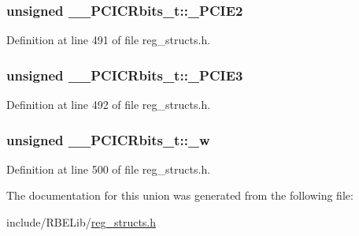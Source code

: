 \hypertarget{union_____p_c_i_c_rbits__t_afb35272c66954efdf211f64643186fb7}{
\subsubsection[{\+\_\+\+P\+C\+I\+E2}]{\setlength{\rightskip}{0pt plus 5cm}unsigned \+\_\+\+\_\+\+P\+C\+I\+C\+Rbits\+\_\+t\+::\+\_\+\+P\+C\+I\+E2}}\label{union_____p_c_i_c_rbits__t_afb35272c66954efdf211f64643186fb7}


Definition at line 491 of file reg\+\_\+structs.\+h.

\hypertarget{union_____p_c_i_c_rbits__t_ab0a10c705c59ecfd8fd8b1dafaa03ef7}{
\subsubsection[{\+\_\+\+P\+C\+I\+E3}]{\setlength{\rightskip}{0pt plus 5cm}unsigned \+\_\+\+\_\+\+P\+C\+I\+C\+Rbits\+\_\+t\+::\+\_\+\+P\+C\+I\+E3}}\label{union_____p_c_i_c_rbits__t_ab0a10c705c59ecfd8fd8b1dafaa03ef7}


Definition at line 492 of file reg\+\_\+structs.\+h.

\hypertarget{union_____p_c_i_c_rbits__t_a3fbcce364039281171632bac73b552ca}{
\subsubsection[{\+\_\+w}]{\setlength{\rightskip}{0pt plus 5cm}unsigned \+\_\+\+\_\+\+P\+C\+I\+C\+Rbits\+\_\+t\+::\+\_\+w}}\label{union_____p_c_i_c_rbits__t_a3fbcce364039281171632bac73b552ca}


Definition at line 500 of file reg\+\_\+structs.\+h.



The documentation for this union was generated from the following file\+:\begin{DoxyCompactItemize}
\item 
include/\+R\+B\+E\+Lib/\hyperlink{reg__structs_8h}{reg\+\_\+structs.\+h}\end{DoxyCompactItemize}

